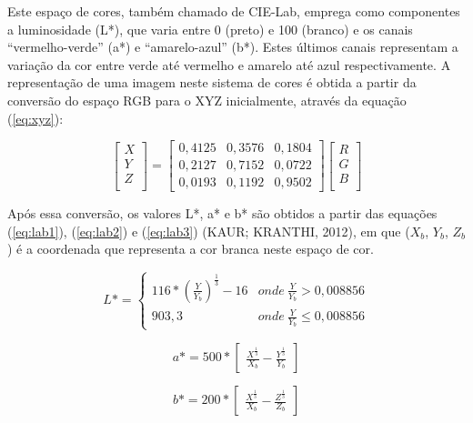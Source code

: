 Este espaço de cores, também chamado de CIE-Lab, emprega como componentes a luminosidade (L*), que varia entre 0 (preto)  e 100 (branco) e os canais “vermelho-verde” (a*) e “amarelo-azul” (b*). Estes últimos canais representam a variação da cor entre verde até vermelho e amarelo até azul respectivamente. A representação de uma imagem neste sistema de cores é obtida a partir da conversão do espaço RGB para o XYZ inicialmente, através da equação (\ref{eq:xyz}):

\begin{equation} \label{eq:xyz}
	\begin{bmatrix}
		X \\
		Y \\
		Z \\
	\end{bmatrix} =
	\begin{bmatrix}
		0,4125 & 0,3576 & 0,1804 \\
		0,2127 & 0,7152 & 0,0722 \\
		0,0193 & 0,1192 & 0,9502
	\end{bmatrix}
	\begin{bmatrix}
		R \\
		G \\
		B \\
	\end{bmatrix}
\end{equation}

Após essa conversão, os valores L*, a* e b* são obtidos a partir das equações (\ref{eq:lab1}), (\ref{eq:lab2}) e (\ref{eq:lab3}) (KAUR; KRANTHI, 2012), em que ($X_b$,  $Y_b$,  $Z_b$) é a coordenada que representa a cor branca neste espaço de cor.  

\begin{equation} \label{eq:lab1}
	L* =
		\begin{cases}
			116*(\frac{Y}{Y_b})^{\frac{1}{3}} - 16 & onde \ \frac{Y}{Y_b} > 0,008856 \\
			903,3 									& onde \ \frac{Y}{Y_b} \leq 0,008856
		\end{cases}
\end{equation}

\begin{equation} \label{eq:lab2}
	a* = 500 * 
		\begin{bmatrix}
			\frac{X^\frac{1}{3}}{X_b} - \frac{Y^\frac{1}{3}}{Y_b}
		\end{bmatrix}
\end{equation}

\begin{equation} \label{eq:lab3}
	b* = 200 *
		\begin{bmatrix}
			\frac{X^\frac{1}{3}}{X_b} - \frac{Z^\frac{1}{3}}{Z_b}
		\end{bmatrix}
\end{equation}


